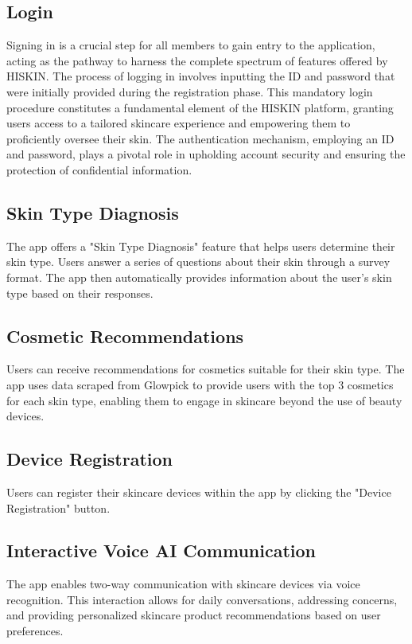 \documentclass[conference]{IEEEtran}
\begin{document}
\subsection{Login}
Signing in is a crucial step for all members to gain entry to the application, acting as the pathway to harness the complete spectrum of features offered by HISKIN. The process of logging in involves inputting the ID and password that were initially provided during the registration phase. This mandatory login procedure constitutes a fundamental element of the HISKIN platform, granting users access to a tailored skincare experience and empowering them to proficiently oversee their skin. The authentication mechanism, employing an ID and password, plays a pivotal role in upholding account security and ensuring the protection of confidential information.\\
\subsection{Skin Type Diagnosis}
The app offers a "Skin Type Diagnosis" feature that helps users determine their skin type. Users answer a series of questions about their skin through a survey format. The app then automatically provides information about the user's skin type based on their responses.\\
\subsection{Cosmetic Recommendations}
Users can receive recommendations for cosmetics suitable for their skin type. The app uses data scraped from Glowpick to provide users with the top 3 cosmetics for each skin type, enabling them to engage in skincare beyond the use of beauty devices.\\
\subsection{Device Registration}
Users can register their skincare devices within the app by clicking the "Device Registration" button. \\
\subsection{Interactive Voice AI Communication}
The app enables two-way communication with skincare devices via voice recognition. This interaction allows for daily conversations, addressing concerns, and providing personalized skincare product recommendations based on user preferences.\\
\end{document}
